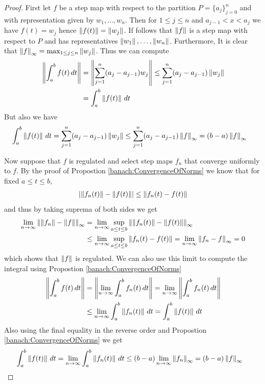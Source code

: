 \begin{proof}
  First let $f$ be a step map with respect to the partition $P = \lbrace a_j \rbrace_{j=0}^n$ and with representation given by $w_1, \dotsc, w_n$.
  Then for $1 \leq j \leq n$ and $a_{j-1} < x < a_j$ we have $f(t) = w_j$ hence $\left \lVert f(t) \right \rVert = \left \lVert w_j \right \rVert$.   If follows that $\left \lVert f \right \rVert$ is a step map with respect
  to $P$ and has representatives $\left \lVert w_1 \right \rVert, \dotsc, \left \lVert w_n \right \rVert$.   Furthermore,  It is clear that $\left \lVert f \right \rVert_\infty = \max_{1 \leq j \leq n} \left \lVert w_j \right \rVert$.   
  Thus we can compute
  \begin{align*}
    \left \lVert \int_a^b f(t) \, dt \right \rVert &= \left \lVert \sum_{j=1}^n (a_j - a_{j-1}) w_j \right \rVert \leq \sum_{j=1}^n (a_j - a_{j-1}) \left \lVert  w_j \right \rVert \\
    &= \int_a^b \left \lVert f(t) \right \rVert \, dt  
  \end{align*}
  But also we have
  \begin{align*}
    \int_a^b \left \lVert f(t) \right \rVert \, dt  &= \sum_{j=1}^n (a_j - a_{j-1}) \left \lVert  w_j \right \rVert \leq \sum_{j=1}^n (a_j - a_{j-1}) \left \lVert f \right \rVert_\infty = (b-a) \left \lVert f \right \rVert_\infty
  \end{align*}

  Now suppose that $f$ is regulated and select step maps $f_n$ that converge uniformly to $f$.   By the proof of Propostion \ref{banach:ConvergenceOfNorms} we know that for fixed $a \leq t \leq b$,
  \begin{align*}
    \left \vert \left \lVert f_n(t) \right \rVert - \left \lVert f(t) \right \rVert \right \vert \leq \left \lVert f_n(t) - f(t) \right \rVert
  \end{align*}
  and thus by taking suprema of both sides we get
  \begin{align*}
    \lim_{n \to \infty} \left \lVert \left \lVert f_n \right \rVert - \left \lVert f \right \rVert \right \rVert_\infty &= \lim_{n \to \infty} \sup_{a \leq t \leq b} \left \lVert \left \lVert f_n(t) \right \rVert - \left \lVert f(t) \right \rVert \right \rVert_\infty\\
    &\leq \lim_{n \to \infty} \sup_{a \leq t \leq b} \left \lVert f_n(t) - f(t) \right \rVert = \lim_{n \to \infty}  \left \lVert f_n - f \right \rVert_\infty = 0
  \end{align*}
  which shows that $\left \lVert f \right \rVert$ is regulated.   We can also use this limit to compute the integral using Propostion \ref{banach:ConvergenceOfNorms} 
  \begin{align*}
    \left \lVert \int_a^b f(t) \, dt \right \rVert &= \left \lVert \lim_{n \to \infty} \int_a^b f_n(t) \, dt \right \rVert = \lim_{n \to \infty} \left \lVert \int_a^b f_n(t) \, dt \right \rVert \\
    &\leq \lim_{n \to \infty} \int_a^b \left \lVert  f_n(t) \right \rVert \, dt = \int_a^b \left \lVert  f(t) \right \rVert \, dt
  \end{align*}
  Also using the final equality in the reverse order and Propostion \ref{banach:ConvergenceOfNorms}  we get
  \begin{align*}
    \int_a^b \left \lVert  f(t) \right \rVert \, dt &= \lim_{n \to \infty} \int_a^b \left \lVert  f_n(t) \right \rVert \, dt \leq (b -a) \lim_{n \to \infty} \left \lVert f_n \right \rVert_\infty =  (b -a) \left \lVert f \right \rVert_\infty 
  \end{align*}
\end{proof}

